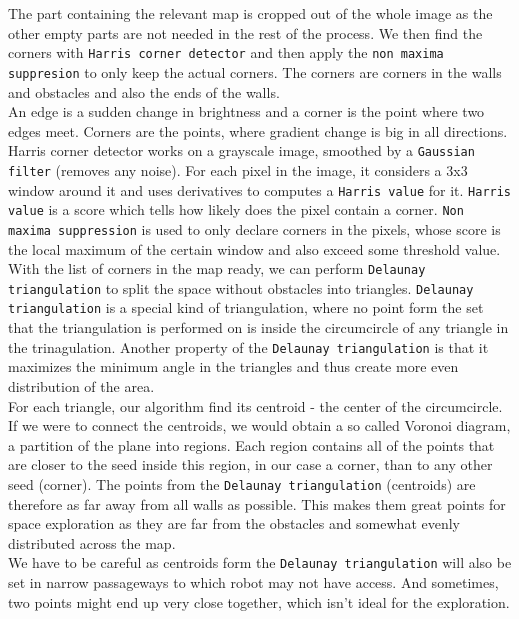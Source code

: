 \documentclass[12pt,a4paper]{article}
\begin{document}
	The part containing the relevant map is cropped out of the whole image as the other empty parts are not needed in the rest of the process. We then find the corners with \texttt{Harris corner detector} and then apply the \texttt{non maxima suppresion} to only keep the actual corners. The corners are corners in the walls and obstacles and also the ends of the walls. \\
	
	An edge is a sudden change in brightness and a corner is the point where two edges meet. Corners are the points, where gradient change is big in all directions. Harris corner detector works on a grayscale image, smoothed by a \texttt{Gaussian filter} (removes any noise). For each pixel in the image, it considers a 3x3 window around it and uses derivatives to computes a \texttt{Harris value} for it. \texttt{Harris value} is a score which tells how likely does the pixel contain a corner. \texttt{Non maxima suppression} is used to only declare corners in the pixels, whose score is the local maximum of the certain window and also exceed some threshold value. \\

	With the list of corners in the map ready, we can perform \texttt{Delaunay triangulation} to split the space without obstacles into triangles. \texttt{Delaunay triangulation} is a special kind of triangulation, where  no point form the set that the triangulation is performed on is inside the circumcircle of any triangle in the trinagulation. Another property of the \texttt{Delaunay triangulation} is that it maximizes the minimum angle in the triangles and thus create more even distribution of the area. \\

	For each triangle, our algorithm find its centroid - the center of the circumcircle. If we were to connect the centroids, we would obtain a so called Voronoi diagram, a partition of the plane into regions. Each region contains all of the points that are closer to the seed inside this region, in our case a corner, than to any other seed (corner). The points from the \texttt{Delaunay triangulation} (centroids) are therefore as far away from all walls as possible. This makes them great points for space exploration as they are far from the obstacles and somewhat evenly distributed across the map. \\

	We have to be careful as centroids form the \texttt{Delaunay triangulation} will also be set in narrow passageways to which robot may not have access. And sometimes, two points might end up very close together, which isn't ideal for the exploration. \\
	
\end{document}
